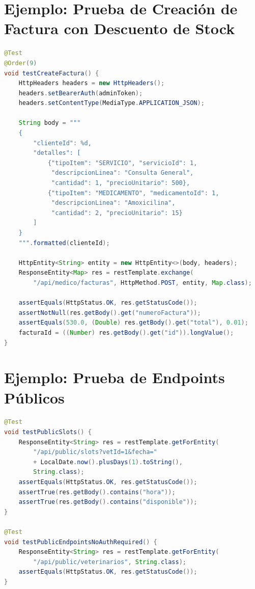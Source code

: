 \section{Ejemplo: Prueba de Creaci\'on de Factura con Descuento de Stock}

\begin{lstlisting}[language=Java, caption=Prueba de integraci\'on para creaci\'on de factura]
@Test
@Order(9)
void testCreateFactura() {
    HttpHeaders headers = new HttpHeaders();
    headers.setBearerAuth(adminToken);
    headers.setContentType(MediaType.APPLICATION_JSON);

    String body = """
    {
        "clienteId": %d,
        "detalles": [
            {"tipoItem": "SERVICIO", "servicioId": 1,
             "descripcionLinea": "Consulta General",
             "cantidad": 1, "precioUnitario": 500},
            {"tipoItem": "MEDICAMENTO", "medicamentoId": 1,
             "descripcionLinea": "Amoxicilina",
             "cantidad": 2, "precioUnitario": 15}
        ]
    }
    """.formatted(clienteId);

    HttpEntity<String> entity = new HttpEntity<>(body, headers);
    ResponseEntity<Map> res = restTemplate.exchange(
        "/api/medico/facturas", HttpMethod.POST, entity, Map.class);

    assertEquals(HttpStatus.OK, res.getStatusCode());
    assertNotNull(res.getBody().get("numeroFactura"));
    assertEquals(530.0, (Double) res.getBody().get("total"), 0.01);
    facturaId = ((Number) res.getBody().get("id")).longValue();
}
\end{lstlisting}

\section{Ejemplo: Prueba de Endpoints P\'ublicos}

\begin{lstlisting}[language=Java, caption=Prueba de agenda p\'ublica sin autenticaci\'on]
@Test
void testPublicSlots() {
    ResponseEntity<String> res = restTemplate.getForEntity(
        "/api/public/slots?vetId=1&fecha="
        + LocalDate.now().plusDays(1).toString(),
        String.class);
    assertEquals(HttpStatus.OK, res.getStatusCode());
    assertTrue(res.getBody().contains("hora"));
    assertTrue(res.getBody().contains("disponible"));
}

@Test
void testPublicEndpointsNoAuthRequired() {
    ResponseEntity<String> res = restTemplate.getForEntity(
        "/api/public/veterinarios", String.class);
    assertEquals(HttpStatus.OK, res.getStatusCode());
}
\end{lstlisting}

